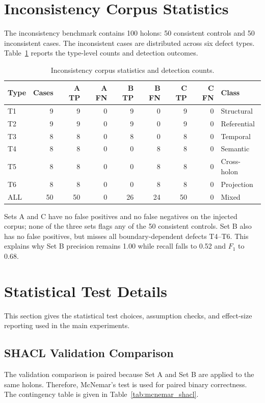 \documentclass[10pt,a4paper]{article}
\begin{document}
\section{Inconsistency Corpus Statistics}
\label{sec:corpusstats}
The inconsistency benchmark contains 100 holons: 50 consistent controls and 50 inconsistent cases. The inconsistent cases are distributed across six defect types. Table~\ref{tab:corpus_stats} reports the type-level counts and detection outcomes.

\begin{table}[H]
\centering
\caption{Inconsistency corpus statistics and detection counts.}
\label{tab:corpus_stats}
\small
\begin{tabular}{lrrrrrrrl}
\toprule
\textbf{Type} & \textbf{Cases} & \textbf{A TP} & \textbf{A FN} & \textbf{B TP} & \textbf{B FN} & \textbf{C TP} & \textbf{C FN} & \textbf{Class} \\
\midrule
T1 & 9 & 9 & 0 & 9 & 0 & 9 & 0 & Structural \\
T2 & 9 & 9 & 0 & 9 & 0 & 9 & 0 & Referential \\
T3 & 8 & 8 & 0 & 8 & 0 & 8 & 0 & Temporal \\
T4 & 8 & 8 & 0 & 0 & 8 & 8 & 0 & Semantic \\
T5 & 8 & 8 & 0 & 0 & 8 & 8 & 0 & Cross-holon \\
T6 & 8 & 8 & 0 & 0 & 8 & 8 & 0 & Projection \\
\midrule
ALL & 50 & 50 & 0 & 26 & 24 & 50 & 0 & Mixed \\
\bottomrule
\end{tabular}
\end{table}

Sets A and C have no false positives and no false negatives on the injected corpus; none of the three sets flags any of the 50 consistent controls. Set B also has no false positives, but misses all boundary-dependent defects T4--T6. This explains why Set B precision remains 1.00 while recall falls to 0.52 and $F_1$ to 0.68.

\section{Statistical Test Details}
\label{sec:stats}
This section gives the statistical test choices, assumption checks, and effect-size reporting used in the main experiments.

\subsection{SHACL Validation Comparison}
The validation comparison is paired because Set A and Set B are applied to the same holons. Therefore, McNemar's test is used for paired binary correctness. The contingency table is given in Table~\ref{tab:mcnemar_shacl}.
\end{document}
